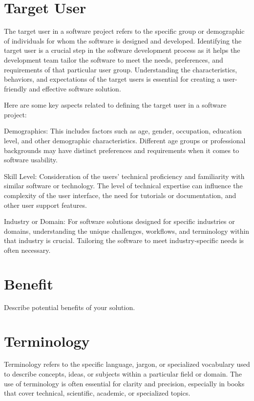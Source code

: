 \section{Target User}
\label{section:target-user}

The target user in a software project refers to the specific
group or demographic of individuals for whom the software is designed and
developed. Identifying the target user is a crucial step in the software
development process as it helps the development team tailor the software to
meet the needs, preferences, and requirements of that particular user group.
Understanding the characteristics, behaviors, and expectations of the target
users is essential for creating a user-friendly and effective software solution.

Here are some key aspects related to defining the target user in a software project:

Demographics: This includes factors such as age, gender,
occupation, education level, and other demographic characteristics. Different
age groups or professional backgrounds may have distinct preferences and
requirements when it comes to software usability.

Skill Level: Consideration of the users' technical proficiency and
familiarity with similar software or technology. The level of technical expertise
can influence the complexity of the user interface, the need for tutorials or
documentation, and other user support features.

Industry or Domain: For software solutions designed for specific
industries or domains, understanding the unique challenges, workflows, and
terminology within that industry is crucial. Tailoring the software to meet
industry-specific needs is often necessary.

\section{Benefit}
\label{section:benefit}

Describe potential benefits of your solution.

\section{Terminology}
\label{section:terminology}

Terminology refers to the specific language, jargon, or
specialized vocabulary used to describe concepts, ideas, or subjects within a
particular field or domain. The use of terminology is often essential for clarity
and precision, especially in books that cover technical, scientific, academic, or
specialized topics.

